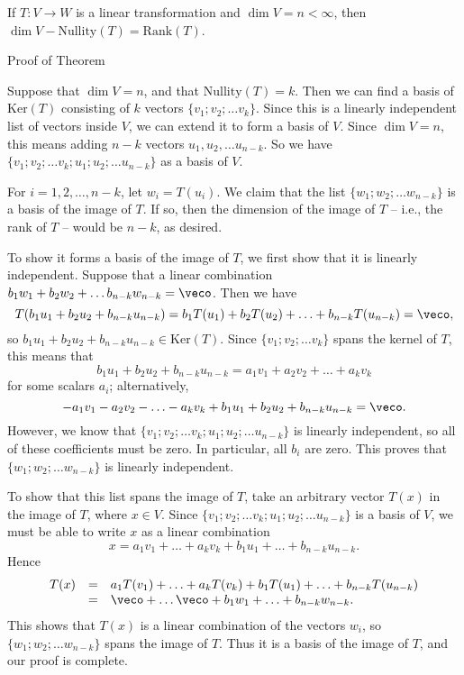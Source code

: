 \endedxproblem


\endedxvertical






{}  If $T:V\rightarrow W$ is a linear transformation and $\dim V = n < \infty$, then $\dim V - \mathrm{Nullity}(T) = \mathrm{Rank}(T)$.  




\begin{edXshowhide}{Proof of Theorem}

Suppose that $\dim V = n$, and that 
$\mathrm{Nullity}(T) = k$.  Then we can find a basis of $\mathrm{Ker}(T)$ consisting of $k$ vectors
$\{v_1; v_2; \ldots v_k\}$.  Since this is a linearly independent list of vectors inside $V$, we can extend
it to form a basis of $V$.  Since $\dim V = n$, this means adding $n-k$ vectors $u_1, u_2, \ldots u_{n-k}$.
So we have $\{v_1; v_2; \ldots v_k; u_1; u_2; \ldots u_{n-k} \}$ as a basis of $V$.  

For $i  = 1, 2, \ldots, n-k$, let $w_i = T(u_i)$.  We claim that 
the list $\{w_1; w_2; \ldots w_{n-k}\}$ is a basis of the image of $T$.  If so, then the dimension of the image
of $T$ -- i.e., the rank of $T$ -- would be
$n-k$, as desired.  

To show it forms a basis of the image of $T$, we first show that it is linearly independent.  
Suppose that a linear combination $b_1w_1 + b_2w_2 + \ldots b_{n-k}w_{n-k} = \veco$.  Then we have
\[ T(b_1u_1 + b_2u_2 + b_{n-k}u_{n-k}) = b_1T(u_1)  + b_2T(u_2) + \ldots + b_{n-k}T(u_{n-k}) = \veco,\]
so $b_1u_1 + b_2u_2 + b_{n-k}u_{n-k} \in \mathrm{Ker}(T).$  Since  
$\{v_1; v_2; \ldots v_k\}$ spans the kernel of $T$, this means that 
\[b_1u_1 + b_2u_2 + b_{n-k}u_{n-k} = a_1v_1 + a_2v_2 + \ldots +a_kv_k\]
for some scalars $a_i$; alternatively,
\[ -a_1v_1 - a_2v_2 - \ldots - a_kv_k + b_1u_1 + b_2u_2 + b_{n-k}u_{n-k} = \veco. \]
However, we know that $\{v_1; v_2; \ldots v_k; u_1; u_2; \ldots u_{n-k} \}$ is linearly independent,
so all of these coefficients must be zero.  In particular, all $b_i$ are zero.  This proves that $\{w_1; w_2; \ldots
w_{n-k} \}$ is linearly independent. 

To show that this list spans the image of $T$, take an arbitrary vector $T(x)$ in the image of $T$, where $x\in V$.
Since $\{v_1; v_2; \ldots v_k; u_1; u_2; \ldots u_{n-k} \}$ is a basis of $V$, we must be able to write
$x$ as a linear combination
\[x = a_1v_1 + \ldots + a_k v_k + b_1u_1 + \ldots + b_{n-k}u_{n-k}.\]
Hence 
\[
\begin{array}{rcl} T(x) &= & a_1T(v_1) + \ldots + a_kT(v_k) + b_1 T(u_1) + \ldots + b_{n-k}T(u_{n-k}) \\
& = & \veco + \ldots \veco + b_1w_1 + \ldots + b_{n-k}w_{n-k}.\end{array}
\]
This shows that $T(x)$ is a linear combination of the vectors $w_i$, so $\{w_1; w_2; \ldots
w_{n-k} \}$ spans the image of $T$.  Thus it is a basis of the image of $T$, and our proof is complete.  

\end{edXshowhide}
